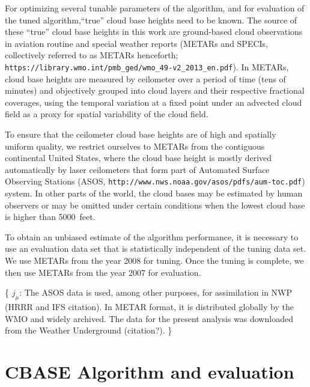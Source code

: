 \documentclass[amt,manuscript]{copernicus}\usepackage[]{graphicx}\usepackage[]{color}
\newcommand{\hlnum}[1]{\textcolor[rgb]{0.686,0.059,0.569}{#1}}%
\newcommand\comment[2]{\{\hlnum{ \textit{#1}: #2}\}}
\newcommand\commentjm[1]{\comment{$j_\mu$}{#1}}
\begin{document}
For optimizing several tunable parameters of the algorithm, and for evaluation
of the tuned algorithm,``true'' cloud base heights need to be known.  The source
of these ``true'' cloud base heights in this work are ground-based cloud
observations in aviation routine and special weather reports (METARs and SPECIs,
collectively referred to as METARs henceforth;
\verb+https://library.wmo.int/pmb_ged/wmo_49-v2_2013_en.pdf+).  In METARs, cloud
base heights are measured by ceilometer over a period of time (tens of minutes)
and objectively grouped into cloud layers and their respective fractional
coverages, using the temporal variation at a fixed point under an advected cloud
field as a proxy for spatial variability of the cloud field.

To ensure that the ceilometer cloud base heights are of high and spatially
uniform quality, we restrict ourselves to METARs from the contiguous continental
United States, where the cloud base height is mostly derived automatically by
laser ceilometers that form part of Automated Surface Observing Stations (ASOS,
\verb+http://www.nws.noaa.gov/asos/pdfs/aum-toc.pdf+) system.  In other parts of
the world, the cloud bases may be estimated by human observers or may be omitted
under certain conditions when the lowest cloud base is higher than 5000~feet.

To obtain an unbiased estimate of the algorithm performance, it is necessary to
use an evaluation data set that is statistically independent of the tuning data
set.  We use METARs from the year 2008 for tuning.  Once the tuning is complete,
we then use METARs from the year 2007 for evaluation.  

\commentjm{The ASOS data is used, among other purposes, for assimilation in NWP
  (HRRR and IFS citation).  In METAR format, it is distributed globally by the
  WMO and widely archived.  The data for the present analysis was downloaded
  from the Weather Underground (citation?). }

\section{CBASE Algorithm and evaluation}
\label{sec:algorithm}
\end{document}
